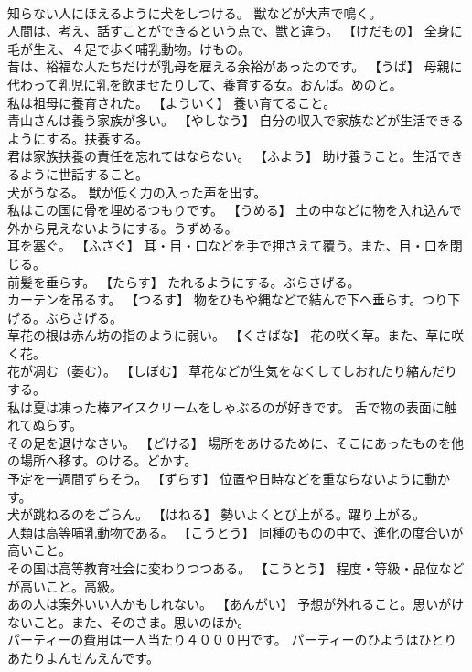 \documentclass[8pt]{extreport}
\begin{document}
\begin{CJK}{UTF8}{min}
\\	知らない人にほえるように犬をしつける。	獣などが大声で鳴く。
\\	人間は、考え、話すことができるという点で、獣と違う。	【けだもの】 全身に毛が生え、４足で歩く哺乳動物。けもの。
\\	昔は、裕福な人たちだけが乳母を雇える余裕があったのです。	【うば】 母親に代わって乳児に乳を飲ませたりして、養育する女。おんば。めのと。
\\	私は祖母に養育された。	【よういく】 養い育てること。
\\	青山さんは養う家族が多い。	【やしなう】 自分の収入で家族などが生活できるようにする。扶養する。
\\	君は家族扶養の責任を忘れてはならない。	【ふよう】 助け養うこと。生活できるように世話すること。
\\	犬がうなる。	獣が低く力の入った声を出す。
\\	私はこの国に骨を埋めるつもりです。	【うめる】 土の中などに物を入れ込んで外から見えないようにする。うずめる。
\\	耳を塞ぐ。	【ふさぐ】 耳・目・口などを手で押さえて覆う。また、目・口を閉じる。
\\	前髪を垂らす。	【たらす】 たれるようにする。ぶらさげる。
\\	カーテンを吊るす。	【つるす】 物をひもや縄などで結んで下へ垂らす。つり下げる。ぶらさげる。
\\	草花の根は赤ん坊の指のように弱い。	【くさばな】 花の咲く草。また、草に咲く花。
\\	花が凋む（萎む）。	【しぼむ】 草花などが生気をなくしてしおれたり縮んだりする。
\\	私は夏は凍った棒アイスクリームをしゃぶるのが好きです。	舌で物の表面に触れてぬらす。
\\	その足を退けなさい。	【どける】 場所をあけるために、そこにあったものを他の場所へ移す。のける。どかす。
\\	予定を一週間ずらそう。	【ずらす】 位置や日時などを重ならないように動かす。
\\	犬が跳ねるのをごらん。	【はねる】 勢いよくとび上がる。躍り上がる。
\\	人類は高等哺乳動物である。	【こうとう】 同種のものの中で、進化の度合いが高いこと。
\\	その国は高等教育社会に変わりつつある。	【こうとう】 程度・等級・品位などが高いこと。高級。
\\	あの人は案外いい人かもしれない。	【あんがい】 予想が外れること。思いがけないこと。また、そのさま。思いのほか。
\\	パーティーの費用は一人当たり４０００円です。	パーティーのひようはひとりあたりよんせんえんです。 

\end{CJK}
\end{document}
